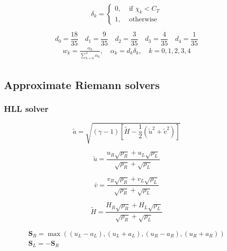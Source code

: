 \begin{equation}
\delta_{k}=\left\{\begin{array}{ll}
0, & \text { if } \chi_{k}<C_{T} \\
1, & \text { otherwise }
\end{array}\right.
\end{equation}

$$d_0=\frac{18}{35} \quad d_1=\frac{9}{35} \quad d_2=\frac{3}{35} \quad d_3=\frac{4}{35} \quad d_4=\frac{1}{35}$$
\begin{equation}
\begin{array}{l}
w_{k}=\frac{\alpha_{k}}{\sum_{k=0}^{4} \alpha_{k}}, \quad \alpha_{k}=d_k\delta_k, \quad k=0,1,2,3,4\\
\end{array}
\end{equation}

\subsection{Approximate Riemann solvers}


\subsubsection{HLL solver}\label{sssec:HLL}

\begin{equation}
\tilde{a}=\sqrt{(\gamma-1)\left[\widetilde{H}-\frac{1}{2}\left(\tilde{u}^{2}+\tilde{v}^{2}\right)\right]}
\end{equation}

\begin{equation}
\tilde{u}=\frac{u_{R} \sqrt{\rho_{R}}+u_{L} \sqrt{\rho_{L}}}{\sqrt{\rho_{R}}+\sqrt{\rho_{L}}}
\end{equation}

\begin{equation}
\bar{v}=\frac{v_{R} \sqrt{\rho_{R}}+v_{L} \sqrt{\rho_{L}}}{\sqrt{\rho_{R}}+\sqrt{\rho_{L}}}
\end{equation}

\begin{equation}
\widetilde{H}=\frac{H_{R} \sqrt{\rho_{R}}+H_{L} \sqrt{\rho_{L}}}{\sqrt{\rho_{R}}+\sqrt{\rho_{L}}}
\end{equation}

\begin{equation}
\begin{array}{l}
\mathbf{S}_{R}=\max \left((u_{L}-a_{L}),(u_{L}+a_{L}),(u_{R}-a_{R}),(u_{R}+a_{R})\right) \\
\mathbf{S}_{L}=-\mathbf{S}_{R}
\end{array}
\end{equation}

